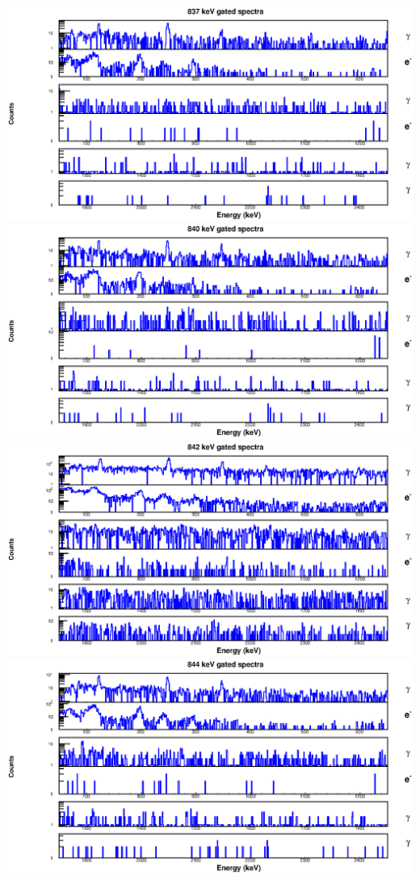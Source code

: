 \begin{landscape}
\includegraphics[scale=1.2]{154Gd_Appendix/837_combined.eps}
\includegraphics[scale=1.2]{154Gd_Appendix/840_combined.eps}
\includegraphics[scale=1.2]{154Gd_Appendix/842_combined.eps}
\includegraphics[scale=1.2]{154Gd_Appendix/844_combined.eps}

\end{landscape}
